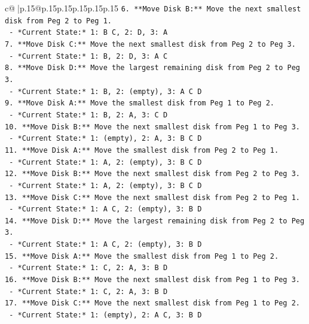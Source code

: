 \documentclass{article}
\begin{document}
{\begin{supertabular}{c@{$\;$}|p{.15\linewidth}@{}p{.15\linewidth}p{.15\linewidth}p{.15\linewidth}p{.15\linewidth}p{.15\linewidth}}
{{{\texttt{6.  **Move Disk B:** Move the next smallest disk from Peg 2 to Peg 1.} \\
\texttt{    {-}   *Current State:* 1: B C, 2: D, 3: A} \\
\texttt{7.  **Move Disk C:** Move the next smallest disk from Peg 2 to Peg 3.} \\
\texttt{    {-}   *Current State:* 1: B, 2: D, 3: A C} \\
\texttt{8.  **Move Disk D:** Move the largest remaining disk from Peg 2 to Peg 3.} \\
\texttt{    {-}   *Current State:* 1: B, 2: (empty), 3: A C D} \\
\texttt{9.  **Move Disk A:** Move the smallest disk from Peg 1 to Peg 2.} \\
\texttt{    {-}   *Current State:* 1: B, 2: A, 3: C D} \\
\texttt{10. **Move Disk B:** Move the next smallest disk from Peg 1 to Peg 3.} \\
\texttt{    {-}   *Current State:* 1: (empty), 2: A, 3: B C D} \\
\texttt{11. **Move Disk A:** Move the smallest disk from Peg 2 to Peg 1.} \\
\texttt{    {-}   *Current State:* 1: A, 2: (empty), 3: B C D} \\
\texttt{12. **Move Disk B:** Move the next smallest disk from Peg 2 to Peg 3.} \\
\texttt{    {-}   *Current State:* 1: A, 2: (empty), 3: B C D} \\
\texttt{13. **Move Disk C:** Move the next smallest disk from Peg 2 to Peg 1.} \\
\texttt{    {-}   *Current State:* 1: A C, 2: (empty), 3: B D} \\
\texttt{14. **Move Disk D:** Move the largest remaining disk from Peg 2 to Peg 3.} \\
\texttt{    {-}   *Current State:* 1: A C, 2: (empty), 3: B D} \\
\texttt{15. **Move Disk A:** Move the smallest disk from Peg 1 to Peg 2.} \\
\texttt{    {-}   *Current State:* 1: C, 2: A, 3: B D} \\
\texttt{16. **Move Disk B:** Move the next smallest disk from Peg 1 to Peg 3.} \\
\texttt{    {-}   *Current State:* 1: C, 2: A, 3: B D} \\
\texttt{17. **Move Disk C:** Move the next smallest disk from Peg 1 to Peg 2.} \\
\texttt{    {-}   *Current State:* 1: (empty), 2: A C, 3: B D} \\
}}}
\end{supertabular}}
\end{document}
